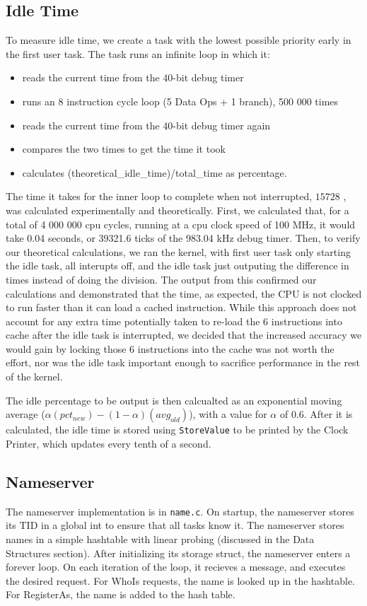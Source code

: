 \documentclass{article}
\begin{document}
\subsection{Idle Time}
To measure idle time, we create a task with the lowest possible priority early in the first user task. The task runs an infinite loop in which it:
\begin{itemize}
    \item reads the current time from the 40-bit debug timer
    \item runs an 8 instruction cycle loop (5 Data Ops + 1 branch), 500 000 times
    \item reads the current time from the 40-bit debug timer again
    \item compares the two times to get the time it took
    \item calculates (theoretical\_idle\_time)/total\_time as percentage.
\end{itemize}
The time it takes for the inner loop to complete when not interrupted, $15728$ , was calculated experimentally and theoretically. First, we calculated that, for a total of 4 000 000 cpu cycles, running at a cpu clock speed of 100 MHz, it would take 0.04 seconds, or 39321.6 ticks of the 983.04 kHz debug timer. Then, to verify our theoretical calculations, we ran the kernel, with first user task only starting the idle task, all interupts off, and the idle task just outputing the difference in times instead of doing the division. The output from this confirmed our calculations and demonstrated that the time, as expected, the CPU is not clocked to run faster than it can load a cached instruction. While this approach does not account for any extra time potentially taken to re-load the 6 instructions into cache after the idle task is interrupted, we decided that the increased accuracy we would gain by locking those 6 instructions into the cache was not worth the effort, nor was the idle task important enough to sacrifice performance in the rest of the kernel.

The idle percentage to be output is then calcualted as an exponential moving average ($\alpha(pct_{new}) - (1 - \alpha)(avg_{old})$), with a value for $\alpha$ of $0.6$.
After it is calculated, the idle time is stored using \verb|StoreValue| to be printed by the Clock Printer, which updates every tenth of a second.

\subsection{Nameserver}
The nameserver implementation is in \verb|name.c|.
On startup, the nameserver stores its TID in a global int to ensure that all tasks know it.
The nameserver stores names in a simple hashtable with linear probing (discussed in the Data Structures section).
After initializing its storage struct, the nameserver enters a forever loop.
On each iteration of the loop, it recieves a message, and executes the desired request.
For WhoIs requests, the name is looked up in the hashtable.
For RegisterAs, the name is added to the hash table.
\end{document}

